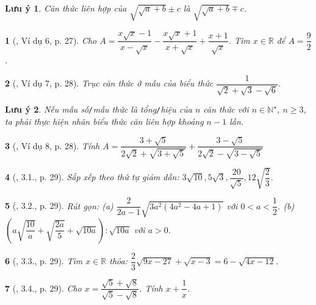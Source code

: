 \documentclass{article}
\newtheorem{baitoan}{}%
\newtheorem{luuy}{Lưu ý}
\begin{document}
\begin{luuy}
	Căn thức liên hợp của $\sqrt{\sqrt{a} + b}\pm c$ là $\sqrt{\sqrt{a} + b}\mp c$.
\end{luuy}

\begin{baitoan}[\cite{Binh_boi_duong_Toan_9_tap_1}, Ví dụ 6, p. 27]
	Cho $A = \dfrac{x\sqrt{x} - 1}{x - \sqrt{x}} - \dfrac{x\sqrt{x} + 1}{x + \sqrt{x}} + \dfrac{x + 1}{\sqrt{x}}$. Tìm $x\in\mathbb{R}$ để $A = \dfrac{9}{2}$.
\end{baitoan}

\begin{baitoan}[\cite{Binh_boi_duong_Toan_9_tap_1}, Ví dụ 7, p. 28]
	Trục căn thức ở mẫu của biểu thức $\dfrac{1}{\sqrt{2} + \sqrt{3} - \sqrt{6}}$.
\end{baitoan}

\begin{luuy}
	Nếu mẫu số{\tt/}mẫu thức là tổng{\tt/}hiệu của $n$ căn thức với $n\in\mathbb{N}^\star$, $n\ge3$, ta phải thực hiện nhân biểu thức căn liên hợp khoảng $n - 1$ lần.
\end{luuy}

\begin{baitoan}[\cite{Binh_boi_duong_Toan_9_tap_1}, Ví dụ 8, p. 28]
	Tính $A = \dfrac{3 + \sqrt{5}}{2\sqrt{2} + \sqrt{3 + \sqrt{5}}} + \dfrac{3 - \sqrt{5}}{2\sqrt{2} - \sqrt{3 - \sqrt{5}}}$
\end{baitoan}

\begin{baitoan}[\cite{Binh_boi_duong_Toan_9_tap_1}, 3.1., p. 29]
	Sắp xếp theo thứ tự giảm dần: $3\sqrt{10},5\sqrt{3},\dfrac{20}{\sqrt{5}},12\sqrt{\dfrac{2}{3}}$.
\end{baitoan}

\begin{baitoan}[\cite{Binh_boi_duong_Toan_9_tap_1}, 3.2., p. 29]
	Rút gọn: (a) $\dfrac{2}{2a - 1}\sqrt{3a^2(4a^2 - 4a + 1)}$ với $0 < a < \dfrac{1}{2}$. (b) $\left(a\sqrt{\dfrac{10}{a}} + \sqrt{\dfrac{2a}{5}} + \sqrt{10a}\right):\sqrt{10a}$ với $a > 0$.
\end{baitoan}

\begin{baitoan}[\cite{Binh_boi_duong_Toan_9_tap_1}, 3.3., p. 29]
	Tìm $x\in\mathbb{R}$ thỏa: $\dfrac{2}{3}\sqrt{9x - 27} + \sqrt{x - 3} = 6 - \sqrt{4x - 12}$.
\end{baitoan}

\begin{baitoan}[\cite{Binh_boi_duong_Toan_9_tap_1}, 3.4., p. 29]
	Cho $x = \dfrac{\sqrt{5} + \sqrt{8}}{\sqrt{5} - \sqrt{8}}$. Tính $x + \dfrac{1}{x}$.
\end{baitoan}
\end{document}
